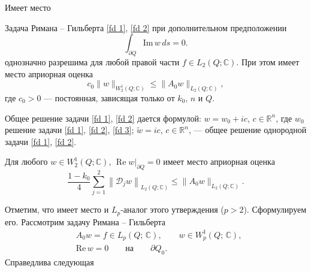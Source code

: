 Имеет место
\begin{theorem}\label{Td1} Задача Римана -- Гильберта \eqref{fd 1}, \eqref{fd 2}
при дополнительном
предположении
\begin{equation}\label{fd 3}
\int_{\partial Q}{\mathrm {Im}}\,w\,ds=0.
\end{equation}
однозначно разрешима для любой правой части $f\in L_2(Q;\mathbb C)$.
При этом имеет место априорная оценка
\begin{equation}\label{fd 0}
c_0\|w\|_{W^1_2(Q;\mathbb C)}\leqslant \|A_0w\|_{L_2(Q;\mathbb C)},
\end{equation}
где $c_0>0$ --- постоянная, зависящая только от $k_0$, $n$ и $Q$.

Общее решение задачи \eqref{fd 1}, \eqref{fd 2} дается формулой: $w=w_0+ic$, $c\in
{\mathbb R}^n$, где $w_0$ решение задачи \eqref{fd 1}, \eqref{fd 2},
\eqref{fd 3}; $\widetilde w=ic$, $c\in\mathbb{R}^n$, --- общее решение однородной
задачи \eqref{fd 1}, \eqref{fd 2}.

Для любого $w\in W^1_2(Q;\mathbb C)
$, $\mathop{\mathrm{Re}}w|_{\partial Q}=0$ имеет место априорная оценка
\begin{equation}\label{fd -1}
\frac{1-k_0}4\sum_{j=1}^2\left\|\mathscr{D}_jw\right\|_{L_2(Q;
\mathbb C)}\leqslant \|A_0w\|_{L_2(Q;\mathbb C)}.
\end{equation}
\end{theorem}

Отметим, что имеет место и $L_p$-аналог этого утверждения  ($p>2$). Сформулируем его.
Рассмотрим задачу Римана -- Гильберта
\begin{align}\label{f1}
 &A_0w =f\in L_p(Q;\,\mathbb C),\qquad
w\in W^1_p(Q;\,\mathbb C), \\\label{fd 4}
 &\text{Re}\,w=0 \qquad \text{на} \qquad {\partial Q}_0.
\end{align}
Справедлива следующая

